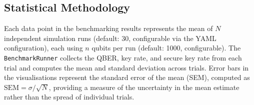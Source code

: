 \subsection{Statistical Methodology}

Each data point in the benchmarking results represents the mean of $N$ independent simulation runs (default: 30, configurable via the YAML configuration), each using $n$ qubits per run (default: 1000, configurable). The \texttt{BenchmarkRunner} collects the QBER, key rate, and secure key rate from each trial and computes the mean and standard deviation across trials. Error bars in the visualisations represent the standard error of the mean (SEM), computed as $\text{SEM} = \sigma / \sqrt{N}$, providing a measure of the uncertainty in the mean estimate rather than the spread of individual trials.


